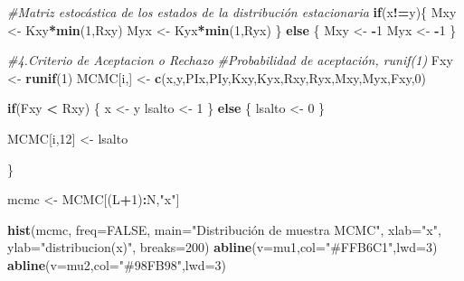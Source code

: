 \documentclass[
]{article}
\newenvironment{Shaded}{\begin{snugshade}}{\end{snugshade}}
\newcommand{\AttributeTok}[1]{\textcolor[rgb]{0.13,0.29,0.53}{#1}}
\newcommand{\CommentTok}[1]{\textcolor[rgb]{0.56,0.35,0.01}{\textit{#1}}}
\newcommand{\ConstantTok}[1]{\textcolor[rgb]{0.56,0.35,0.01}{#1}}
\newcommand{\ControlFlowTok}[1]{\textcolor[rgb]{0.13,0.29,0.53}{\textbf{#1}}}
\newcommand{\DecValTok}[1]{\textcolor[rgb]{0.00,0.00,0.81}{#1}}
\newcommand{\FunctionTok}[1]{\textcolor[rgb]{0.13,0.29,0.53}{\textbf{#1}}}
\newcommand{\NormalTok}[1]{#1}
\newcommand{\OtherTok}[1]{\textcolor[rgb]{0.56,0.35,0.01}{#1}}
\newcommand{\SpecialCharTok}[1]{\textcolor[rgb]{0.81,0.36,0.00}{\textbf{#1}}}
\newcommand{\StringTok}[1]{\textcolor[rgb]{0.31,0.60,0.02}{#1}}
\begin{document}
\begin{Shaded}
\begin{Highlighting}[]
  \CommentTok{\#Matriz estocástica de los estados de la distribución estacionaria }
  \ControlFlowTok{if}\NormalTok{(x}\SpecialCharTok{!=}\NormalTok{y)\{ }
\NormalTok{    Mxy }\OtherTok{\textless{}{-}}\NormalTok{ Kxy}\SpecialCharTok{*}\FunctionTok{min}\NormalTok{(}\DecValTok{1}\NormalTok{,Rxy) }
\NormalTok{    Myx }\OtherTok{\textless{}{-}}\NormalTok{ Kyx}\SpecialCharTok{*}\FunctionTok{min}\NormalTok{(}\DecValTok{1}\NormalTok{,Ryx) }
\NormalTok{  \} }\ControlFlowTok{else}\NormalTok{ \{}
\NormalTok{    Mxy }\OtherTok{\textless{}{-}} \SpecialCharTok{{-}}\DecValTok{1} 
\NormalTok{    Myx }\OtherTok{\textless{}{-}} \SpecialCharTok{{-}}\DecValTok{1} 
\NormalTok{  \} }
  
  \CommentTok{\#4.Criterio de Aceptacion o Rechazo }
  \CommentTok{\#Probabilidad de aceptación, runif(1) }
\NormalTok{  Fxy }\OtherTok{\textless{}{-}} \FunctionTok{runif}\NormalTok{(}\DecValTok{1}\NormalTok{) }
\NormalTok{  MCMC[i,] }\OtherTok{\textless{}{-}} \FunctionTok{c}\NormalTok{(x,y,PIx,PIy,Kxy,Kyx,Rxy,Ryx,Mxy,Myx,Fxy,}\DecValTok{0}\NormalTok{) }
  
  \ControlFlowTok{if}\NormalTok{(Fxy }\SpecialCharTok{\textless{}}\NormalTok{ Rxy) \{ }
\NormalTok{    x }\OtherTok{\textless{}{-}}\NormalTok{ y }
\NormalTok{    lsalto }\OtherTok{\textless{}{-}} \DecValTok{1} 
\NormalTok{  \} }\ControlFlowTok{else}\NormalTok{ \{}
\NormalTok{    lsalto }\OtherTok{\textless{}{-}} \DecValTok{0} 
\NormalTok{  \}}
  
\NormalTok{  MCMC[i,}\DecValTok{12}\NormalTok{]  }\OtherTok{\textless{}{-}}\NormalTok{ lsalto}
  
\NormalTok{\} }

\NormalTok{mcmc }\OtherTok{\textless{}{-}}\NormalTok{ MCMC[(L}\SpecialCharTok{+}\DecValTok{1}\NormalTok{)}\SpecialCharTok{:}\NormalTok{N,}\StringTok{"x"}\NormalTok{]}
\end{Highlighting}
\end{Shaded}

\begin{Shaded}
\begin{Highlighting}[]
\FunctionTok{hist}\NormalTok{(mcmc, }\AttributeTok{freq=}\ConstantTok{FALSE}\NormalTok{, }\AttributeTok{main=}\StringTok{"Distribución de muestra MCMC"}\NormalTok{, }\AttributeTok{xlab=}\StringTok{"x"}\NormalTok{, }
     \AttributeTok{ylab=}\StringTok{"distribucion(x)"}\NormalTok{, }\AttributeTok{breaks=}\DecValTok{200}\NormalTok{) }
\FunctionTok{abline}\NormalTok{(}\AttributeTok{v=}\NormalTok{mu1,}\AttributeTok{col=}\StringTok{"\#FFB6C1"}\NormalTok{,}\AttributeTok{lwd=}\DecValTok{3}\NormalTok{) }
\FunctionTok{abline}\NormalTok{(}\AttributeTok{v=}\NormalTok{mu2,}\AttributeTok{col=}\StringTok{"\#98FB98"}\NormalTok{,}\AttributeTok{lwd=}\DecValTok{3}\NormalTok{)}
\end{Highlighting}
\end{Shaded}
\end{document}
